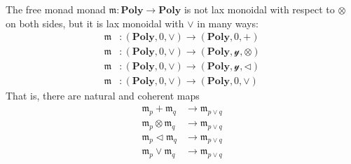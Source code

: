 \documentclass[11pt, one side, article]{memoir}
\theoremstyle{definition}
\theoremstyle{plain}
\newcommand{\Cat}[1]{\mathbf{#1}}%
\newcommand{\yon}{\mathcal{y}}
\newcommand{\poly}{\Cat{Poly}}
\newcommand{\0}{\textsf{0}}
\newcommand{\1}{\tn{\textsf{1}}}
\newcommand{\tri}{\mathbin{\triangleleft}}
\begin{document}
The free monad monad $\mathfrak{m}\colon\poly\to\poly$ is not lax monoidal with respect to $\otimes$ on both sides, but it is lax monoidal with $\vee$ in many ways:
\begin{align}\label{eqn.vees}
	\mathfrak{m}&\colon(\poly,0,\vee)\to(\poly,0,+)\\
	\mathfrak{m}&\colon(\poly,0,\vee)\to(\poly,\yon,\otimes)\\
	\mathfrak{m}&\colon(\poly,0,\vee)\to(\poly,\yon,\tri)\\
	\mathfrak{m}&\colon(\poly,0,\vee)\to(\poly,0,\vee)
\end{align}
That is, there are natural and coherent maps
\begin{align}
	\mathfrak{m}_p+\mathfrak{m}_q&\to\mathfrak{m}_{p\vee q}\\
	\mathfrak{m}_p\otimes\mathfrak{m}_q&\to\mathfrak{m}_{p\vee q}\\
	\mathfrak{m}_p\tri\mathfrak{m}_q&\to\mathfrak{m}_{p\vee q}\\
	\mathfrak{m}_p\vee\mathfrak{m}_q&\to\mathfrak{m}_{p\vee q}
\end{align}
\end{document}
